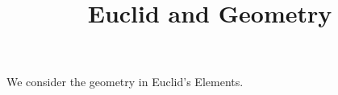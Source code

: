 \documentclass{ximera}
\title{Euclid and Geometry}
\begin{document}
\begin{abstract}
\end{abstract}
\maketitle

We consider the geometry in Euclid's Elements.
\end{document}
